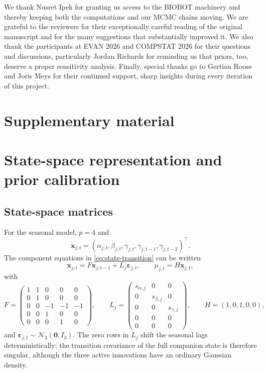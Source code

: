 \documentclass[11pt,a4paper]{article}
\newcommand{\N}{\mathcal N}
\begin{document}
	We thank Nusret Ipek for granting us access to the BIOBOT machinery and thereby keeping both the computations and our MCMC chains moving. We are grateful to the reviewers for their exceptionally careful reading of the original manuscript and for the many suggestions that substantially improved it. We also thank the participants at EVAN 2026 and COMPSTAT 2026 for their questions and discussions, particularly Jordan Richards for reminding us that priors, too, deserve a proper sensitivity analysis. Finally, special thanks go to Gertian Roose and Joris Meys for their continued support, sharp insights during every iteration of this project.
	
	\clearpage
	\appendix
	\renewcommand{\thesection}{S\arabic{section}}
	\setcounter{section}{0}
	\setcounter{figure}{0}
	\setcounter{table}{0}
	\setcounter{equation}{0}
	\section*{Supplementary material}
	\section{State-space representation and prior calibration}
	\label{supp:priors}
	
	\subsection{State-space matrices}
	\label{supp:state-representation}
	
	For the seasonal model, \(p=4\) and
	\[
	\bm x_{j,t}
	=
	(\alpha_{j,t},\beta_{j,t},
	\gamma_{j,t},\gamma_{j,t-1},\gamma_{j,t-2})^\top.
	\]
	The component equations in \cref{eq:state-transition} can be written
	\begin{equation}\label{eq:supp-state-matrix}
		\bm x_{j,t}
		=
		F\bm x_{j,t-1}
		+L_j\bm\varepsilon_{j,t},
		\qquad
		\mu_{j,t}=H\bm x_{j,t},
	\end{equation}
	with
	\[
	F=
	\begin{pmatrix}
		1&1&0&0&0\\
		0&1&0&0&0\\
		0&0&-1&-1&-1\\
		0&0&1&0&0\\
		0&0&0&1&0
	\end{pmatrix},
	\qquad
	L_j=
	\begin{pmatrix}
		s_{\alpha,j}&0&0\\
		0&s_{\beta,j}&0\\
		0&0&s_{\gamma,j}\\
		0&0&0\\
		0&0&0
	\end{pmatrix},
	\qquad
	H=(1,0,1,0,0),
	\]
	and \(\bm\varepsilon_{j,t}\sim\N_3(\bm0,I_3)\). The zero rows in
	\(L_j\) shift the seasonal lags deterministically; the transition
	covariance of the full companion state is therefore singular, although
	the three active innovations have an ordinary Gaussian density.
	
\end{document}
